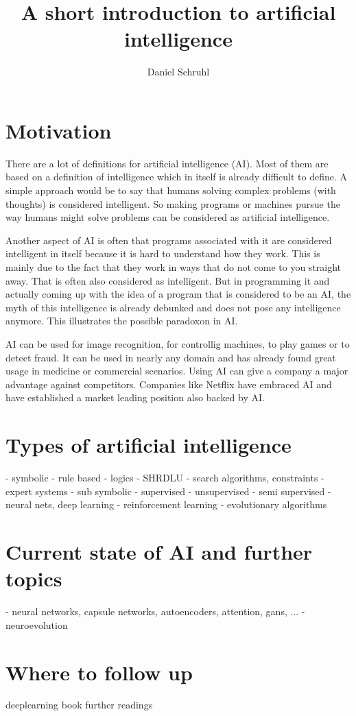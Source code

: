 \documentclass[jou,apacite]{apa6}
\title{A short introduction to artificial intelligence}
\author{Daniel Schruhl}
\affiliation{ThoughtWorks}
\begin{document}
\maketitle    
                        
\section{Motivation}
There are a lot of definitions for artificial intelligence (AI). Most of them are based on a definition of intelligence which in itself is already difficult to define. A simple approach would be to say that humans solving complex problems (with thoughts) is considered intelligent. So making programs or machines pursue the way humans might solve problems can be considered as artificial intelligence.

Another aspect of AI is often that programs associated with it are considered intelligent in itself because it is hard to understand how they work. This is mainly due to the fact that they work in ways that do not come to you straight away. That is often also considered as intelligent.
But in programming it and actually coming up with the idea of a program that is considered to be an AI, the myth of this intelligence is already debunked and does not pose any intelligence anymore. This illustrates the possible paradoxon in AI.

AI can be used for image recognition, for controllig machines, to play games or to detect fraud. It can be used in nearly any domain and has already found great usage in medicine or commercial scenarios. Using AI can give a company a major advantage against competitors. Companies like Netflix have embraced AI \cite{Gomez-Uribe2015} and have established a market leading position also backed by AI.

\section{Types of artificial intelligence}
 - symbolic
  - rule based
  - logics
  - SHRDLU
  - search algorithms, constraints
  - expert systems
 - sub symbolic
  - supervised
  - unsupervised
  - semi supervised
   - neural nets, deep learning
  - reinforcement learning
  - evolutionary algorithms

\section{Current state of AI and further topics}
 - neural networks, capsule networks, autoencoders, attention, gans, ...
 - neuroevolution

\section{Where to follow up}
deeplearning book
further readings


\end{document}
